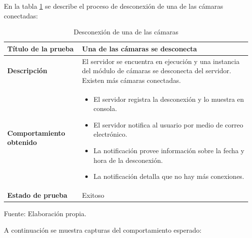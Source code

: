 En la tabla \ref{n_cameras_one_desconnected} se describe el proceso de desconexión de una de las cámaras conectadas:\\

\begin{table}[H]
    \caption{Desconexión de una de las cámaras}
    \begin{center}
        \begin{tabular}{|>{\centering}p{}|m{}<{\centering}|} 
            \hline
            \textbf{Título de la prueba} & \textbf{Una de las cámaras se desconecta} \\
            \hline
            \textbf{Descripción} & El servidor se encuentra en ejecución y una instancia del módulo de cámaras se desconecta del servidor. Existen más cámaras conectadas.\\
            \hline
            \textbf{Comportamiento obtenido} & 
            \begin{itemize}
                \item El servidor registra la desconexión y lo muestra en consola.
                \item El servidor notifica al usuario por medio de correo electrónico.
                \item La notificación provee información sobre la fecha y hora de la desconexión.
                \item La notificación detalla que no hay más conexiones.
            \end{itemize} \\ 
            \hline
            \textbf{Estado de prueba} & Exitoso \\
            \hline
        \end{tabular}
    \end{center}
    \begin{center}
        Fuente: Elaboración propia.
        \label{n_cameras_one_desconnected}
    \end{center}    
\end{table}

A continuación se muestra capturas del comportamiento esperado:

